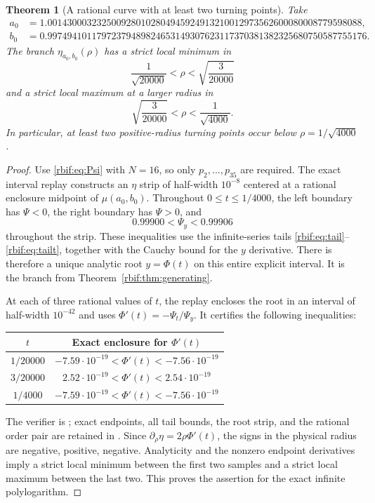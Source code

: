 \documentclass[11pt,a4paper]{article}
\newtheorem{theorem}{Theorem}[section]
\theoremstyle{definition}\newtheorem{definition}[theorem]{Definition}
\theoremstyle{remark}\newtheorem{remark}[theorem]{Remark}
\numberwithin{equation}{section}
\begin{document}
\begin{theorem}[A rational curve with at least two turning points]
\label{rbif:thm:witness}
Take
\begin{align*}
 a_0&=1.0014300032325009280102804945924913210012973562600080008779598088,\\
 b_0&=0.99749410117972379489824653149307623117370381382325680750587755176.
\end{align*}
The branch $\eta_{a_0,b_0}(\rho)$ has a strict local minimum in
\[
 \frac1{\sqrt{20000}}<\rho<\sqrt{\frac3{20000}}
\]
and a strict local maximum at a larger radius in
\[
 \sqrt{\frac3{20000}}<\rho<\frac1{\sqrt{4000}}.
\]
In particular, at least two positive-radius turning points occur below
$\rho=1/\sqrt{4000}$.
\end{theorem}
\begin{proof}
Use \eqref{rbif:eq:Psi} with $N=16$, so only
$p_2,\ldots,p_{35}$ are required. The exact interval replay constructs
an $\eta$ strip of half-width $10^{-8}$ centered at a rational enclosure
midpoint of $\mu(a_0,b_0)$. Throughout
$0\le t\le1/4000$, the left boundary has $\Psi<0$, the right boundary
has $\Psi>0$, and
\begin{equation}
 0.99900<\Psi_y<0.99906
 \label{rbif:eq:witnessstrip}
\end{equation}
throughout the strip. These inequalities use the infinite-series tails
\eqref{rbif:eq:tail}--\eqref{rbif:eq:tailt}, together with the Cauchy
bound for the $y$ derivative. There is therefore a unique analytic root
$y=\Phi(t)$ on this entire explicit interval. It is the branch from
Theorem~\ref{rbif:thm:generating}.

At each of three rational values of $t$, the replay encloses the root in
an interval of half-width $10^{-42}$ and uses
$\Phi'(t)=-\Psi_t/\Psi_y$. It certifies the following inequalities:
\begin{center}
\begin{tabular}{@{}cc@{}}
\toprule
$t$ & Exact enclosure for $\Phi'(t)$\\
\midrule
$1/20000$ & $-7.59\cdot10^{-19}<\Phi'(t)<-7.56\cdot10^{-19}$\\[1mm]
$3/20000$ & $ 2.52\cdot10^{-19}<\Phi'(t)< 2.54\cdot10^{-19}$\\[1mm]
$1/4000$ & $-7.59\cdot10^{-19}<\Phi'(t)<-7.56\cdot10^{-19}$\\
\bottomrule
\end{tabular}
\end{center}
The verifier is ; exact endpoints, all tail
bounds, the root strip, and the rational order pair are retained in
. Since $\partial_\rho\eta=2\rho\Phi'(t)$,
the signs in the physical radius are negative, positive, negative.
Analyticity and the nonzero endpoint derivatives imply a strict local
minimum between the first two samples and a strict local maximum between
the last two. This proves the assertion for the exact infinite
polylogarithm.
\end{proof}
\end{document}
